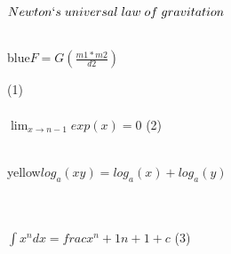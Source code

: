 \documentclass{article}
\begin{document}
$Newton\lq s\; universal \; law\; of \; gravitation$\\
\\
\hspace{10cm}\begin{color}{blue}{$F=G(\frac{m1*m2}{d2})$}
\end{color}\hspace{10cm}(1)
\\
\\
\hspace{5cm}
\hspace{10cm}$\lim_{x \to n-1} exp(x)=0$
\hspace{9cm}(2)\\ \\
\begin{colorbox}{yellow}{$log_a(xy)=log_a(x)+log_a(y)$}
\end{colorbox}
\\
\\
\hspace{10cm}$\int x^ndx=frac{x^n+1}{n+1}+c$
\hspace{8cm}(3)
\end{document}
